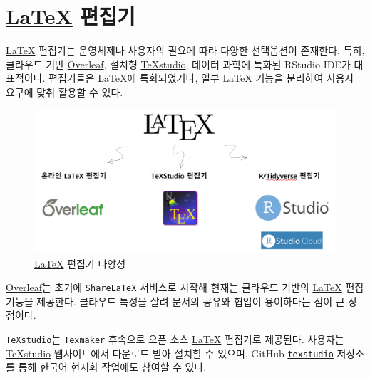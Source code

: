 \documentclass[
  letterpaper,
]{book}
\begin{document}
\hypertarget{latex-editor}{%
\section{\texorpdfstring{\href{http://example.org}{\LaTeX}
편집기}{ 편집기}}\label{latex-editor}}

\href{http://example.org}{\LaTeX} 편집기는 운영체제나 사용자의 필요에
따라 다양한 선택옵션이 존재한다. 특히, 클라우드 기반
\href{https://www.overleaf.com/}{Overleaf}, 설치형
\href{https://www.texstudio.org/}{TeXstudio}, 데이터 과학에 특화된
RStudio IDE가 대표적이다. 편집기들은 \href{http://example.org}{\LaTeX}에
특화되었거나, 일부 \href{http://example.org}{\LaTeX} 기능을 분리하여
사용자 요구에 맞춰 활용할 수 있다.

\begin{figure}

{\centering \includegraphics[width=11.98958in,height=\textheight]{images/latex-editor.png}

}

\caption{\href{http://example.org}{\LaTeX} 편집기 다양성}

\end{figure}

\href{https://www.overleaf.com/}{Overleaf}는 초기에 \texttt{ShareLaTeX}
서비스로 시작해 현재는 클라우드 기반의 \href{http://example.org}{\LaTeX}
편집 기능을 제공한다. 클라우드 특성을 살려 문서의 공유와 협업이
용이하다는 점이 큰 장점이다.

\texttt{TeXstudio}는 \texttt{Texmaker} 후속으로 오픈 소스
\href{http://example.org}{\LaTeX} 편집기로 제공된다. 사용자는
\href{https://www.texstudio.org/}{TeXstudio} 웹사이트에서 다운로드 받아
설치할 수 있으며, GitHub
\href{https://github.com/texstudio-org/texstudio}{\texttt{texstudio}}
저장소를 통해 한국어 현지화 작업에도 참여할 수 있다.
\end{document}
